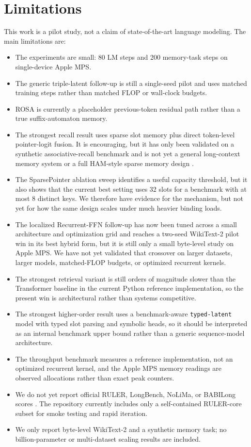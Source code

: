 \documentclass[11pt]{article}
\begin{document}
\section{Limitations}
This work is a pilot study, not a claim of state-of-the-art language modeling.
The main limitations are:
\begin{itemize}[leftmargin=1.25em]
  \item The experiments are small: 80 LM steps and 200 memory-task steps on
  single-device Apple MPS.
  \item The generic triple-latent follow-up is still a single-seed pilot and
  uses matched training steps rather than matched FLOP or wall-clock budgets.
  \item ROSA is currently a placeholder previous-token residual path rather
  than a true suffix-automaton memory.
  \item The strongest recall result uses sparse slot memory plus direct
  token-level pointer-logit fusion. It is encouraging, but it has only been
  validated on a synthetic associative-recall benchmark and is not yet a
  general long-context memory system or a full HAM-style sparse memory design
  \citep{ham2026}.
  \item The SparsePointer ablation sweep identifies a useful capacity
  threshold, but it also shows that the current best setting uses 32 slots for
  a benchmark with at most 8 distinct keys. We therefore have evidence for the
  mechanism, but not yet for how the same design scales under much heavier
  binding loads.
  \item The localized Recurrent-FFN follow-up has now been tuned across a small
  architecture and optimization grid and reaches a two-seed WikiText-2 pilot
  win in its best hybrid form, but it is still only a small byte-level study
  on Apple MPS. We have not yet validated that crossover on larger datasets,
  larger models, matched-FLOP budgets, or optimized recurrent kernels.
  \item The strongest retrieval variant is still orders of magnitude slower
  than the Transformer baseline in the current Python reference
  implementation, so the present win is architectural rather than systems
  competitive.
  \item The strongest higher-order result uses a benchmark-aware
  \texttt{typed-latent} model with typed slot parsing and symbolic heads, so
  it should be interpreted as an internal benchmark upper bound rather than a
  generic sequence-model architecture.
  \item The throughput benchmark measures a reference implementation, not an
  optimized recurrent kernel, and the Apple MPS memory readings are observed
  allocations rather than exact peak counters.
  \item We do not yet report official RULER, LongBench, NoLiMa, or BABILong
  scores \citep{hsieh2024ruler,longbench2023,nolima2025,babilong2024}. The
  repository currently includes only a self-contained RULER-core subset for
  smoke testing and rapid iteration.
  \item We only report byte-level WikiText-2 and a synthetic memory task; no
  billion-parameter or multi-dataset scaling results are included.
\end{itemize}
\end{document}
